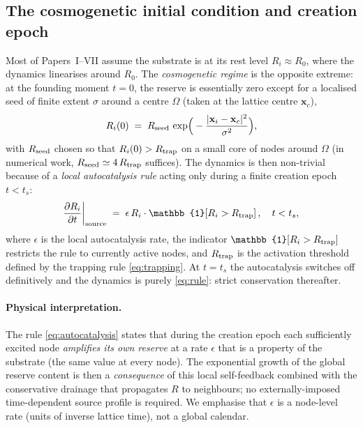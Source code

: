 \documentclass[11pt,a4paper]{article}
\begin{document}
\subsection{The cosmogenetic initial condition and creation epoch}
\label{sec:cosmogenetic-rule}

Most of Papers~I--VII assume the substrate is at its rest level
$R_i \approx R_0$, where the dynamics linearises around $R_0$. The
\emph{cosmogenetic regime} is the opposite extreme: at the founding
moment $t = 0$, the reserve is essentially zero except for a
localised seed of finite extent $\sigma$ around a centre $\Omega$
(taken at the lattice centre $\mathbf{x}_c$),
\begin{equation}
R_i(0) \;=\; R_{\rm seed}\,
\exp\!\Big(-\frac{|\mathbf{x}_i - \mathbf{x}_c|^2}{\sigma^2}\Big),
\label{eq:seed}
\end{equation}
with $R_{\rm seed}$ chosen so that $R_i(0) > R_{\rm trap}$ on a small
core of nodes around $\Omega$ (in numerical work, $R_{\rm seed} \simeq
4\,R_{\rm trap}$ suffices). The dynamics is then non-trivial because
of a \emph{local autocatalysis rule} acting only during a finite
creation epoch $t < t_s$:
\begin{equation}
\frac{\partial R_i}{\partial t}\bigg|_{\rm source} \;=\;
\epsilon \, R_i \cdot \mathbb{1}\!\left[R_i > R_{\rm trap}\right],
\quad t < t_s,
\label{eq:autocatalysis}
\end{equation}
where $\epsilon$ is the local autocatalysis rate, the indicator
$\mathbb{1}[R_i > R_{\rm trap}]$ restricts the rule to currently
active nodes, and $R_{\rm trap}$ is the activation threshold defined
by the trapping rule \eqref{eq:trapping}. At $t = t_s$ the
autocatalysis switches off definitively and the dynamics is purely
\eqref{eq:rule}: strict conservation thereafter.

\paragraph{Physical interpretation.} The rule
\eqref{eq:autocatalysis} states that during the creation epoch each
sufficiently excited node \emph{amplifies its own reserve} at a rate
$\epsilon$ that is a property of the substrate (the same value at
every node). The exponential growth of the global reserve content
is then a \emph{consequence} of this local self-feedback combined
with the conservative drainage that propagates $R$ to neighbours;
no externally-imposed time-dependent source profile is required. We
emphasise that $\epsilon$ is a node-level rate (units of inverse
lattice time), not a global calendar.
\end{document}
